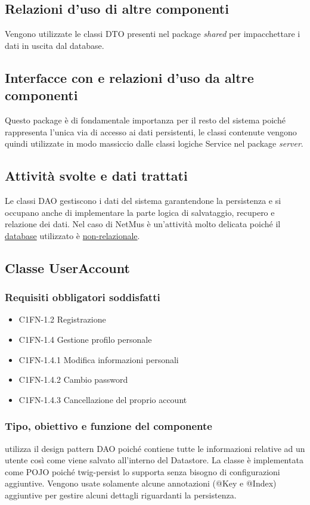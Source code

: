 \subsection*{Relazioni d'uso di altre componenti}
Vengono utilizzate le classi DTO presenti nel package \emph{shared} per
impacchettare i dati in uscita dal database. 
\subsection*{Interfacce con e relazioni d'uso da altre componenti}
Questo package \`e di fondamentale importanza per il resto del sistema poich\'e
rappresenta l'unica via di accesso ai dati persistenti, le classi contenute
vengono quindi utilizzate in modo massiccio dalle classi logiche Service nel
package \emph{server}.
\subsection*{Attivit\`a svolte e dati trattati}
Le classi DAO gestiscono i dati del sistema garantendone la persistenza e si
occupano anche di implementare la parte logica di salvataggio, recupero e
relazione dei dati. Nel caso di NetMus \`e un'attivit\`a molto delicata poich\'e il
\underline{database} utilizzato \`e \underline{non-relazionale}.

\subsection{Classe UserAccount}
\subsubsection*{Requisiti obbligatori soddisfatti}
\begin{itemize}
	\item C1FN-1.2 Registrazione
	\item C1FN-1.4 Gestione profilo personale
	\item C1FN-1.4.1 Modifica informazioni personali
	\item C1FN-1.4.2 Cambio password
	\item C1FN-1.4.3 Cancellazione del proprio account
\end{itemize}
\subsubsection*{Tipo, obiettivo e funzione del componente}
 utilizza il design pattern DAO poich\'e contiene tutte le
informazioni relative ad un utente cos\`i come viene salvato all'interno del
Datastore. La classe \`e implementata come POJO poich\'e twig-persist lo
supporta senza bisogno di configurazioni aggiuntive. Vengono usate solamente
alcune annotazioni (@Key e @Index) aggiuntive per gestire alcuni dettagli
riguardanti la persistenza. 
